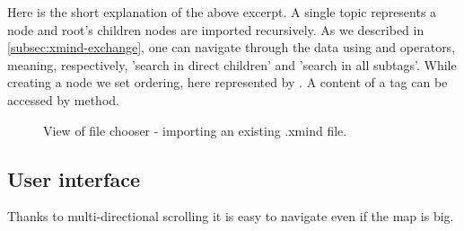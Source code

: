 Here is the short explanation of the above excerpt. A single topic represents a node and root's children nodes are imported recursively. As we described in \cref{subsec:xmind-exchange}, one can navigate through the data using \inlinecode{\textbackslash} and \inlinecode{\textbackslash\textbackslash} operators, meaning, respectively, 'search in direct children' and 'search in all subtags'. While creating a node we set ordering, here represented by .  A content of a tag can be accessed by  method. 

\begin{figure}[h]
	\centering
	\caption{View of file chooser - importing an existing .xmind file.}
	\label{fig:screen-filechooser}
\end{figure}


\subsection{User interface}
\label{subsec:ui}
Thanks to multi-directional scrolling it is easy to navigate even if the map is big.

